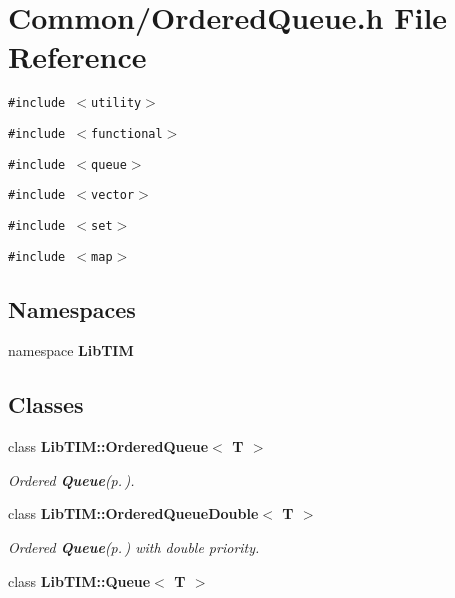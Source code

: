 \section{Common/Ordered\-Queue.h File Reference}
\label{OrderedQueue_8h}
{\tt \#include $<$utility$>$}\par
{\tt \#include $<$functional$>$}\par
{\tt \#include $<$queue$>$}\par
{\tt \#include $<$vector$>$}\par
{\tt \#include $<$set$>$}\par
{\tt \#include $<$map$>$}\par
\subsection*{Namespaces}
\begin{CompactItemize}
\item 
namespace {\bf Lib\-TIM}
\end{CompactItemize}
\subsection*{Classes}
\begin{CompactItemize}
\item 
class {\bf Lib\-TIM::Ordered\-Queue$<$ T $>$}
\begin{CompactList}\small\item\em Ordered {\bf Queue}{\rm (p.\,\pageref{classLibTIM_1_1Queue})}. \item\end{CompactList}\item 
class {\bf Lib\-TIM::Ordered\-Queue\-Double$<$ T $>$}
\begin{CompactList}\small\item\em Ordered {\bf Queue}{\rm (p.\,\pageref{classLibTIM_1_1Queue})} with double priority. \item\end{CompactList}\item 
class {\bf Lib\-TIM::Queue$<$ T $>$}
\end{CompactItemize}
